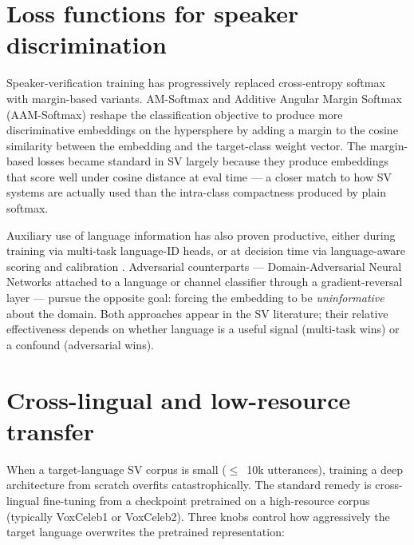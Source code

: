 \section{Loss functions for speaker discrimination}
\label{sec:related-loss}

Speaker-verification training has progressively replaced cross-entropy
softmax with margin-based variants. AM-Softmax and Additive Angular
Margin Softmax (AAM-Softmax) \cite{deng2019arcface} reshape the
classification objective to produce more discriminative embeddings
on the hypersphere by adding a margin to the cosine similarity
between the embedding and the target-class weight vector. The
margin-based losses became standard in SV largely because they
produce embeddings that score well under cosine distance at eval
time — a closer match to how SV systems are actually used than the
intra-class compactness produced by plain softmax.


Auxiliary use of language information has also proven productive,
either during training via multi-task language-ID heads, or at
decision time via language-aware scoring and calibration
\cite{thienpondt2022calibration}.
Adversarial counterparts — Domain-Adversarial Neural Networks
\cite{ganin2015dann} attached to a language or channel classifier
through a gradient-reversal layer — pursue the opposite goal: forcing
the embedding to be \emph{uninformative} about the domain. Both
approaches appear in the SV literature; their relative effectiveness
depends on whether language is a useful signal (multi-task wins)
or a confound (adversarial wins).

\section{Cross-lingual and low-resource transfer}
\label{sec:related-crosslingual}

When a target-language SV corpus is small ($\leq$~10k utterances),
training a deep architecture from scratch overfits catastrophically.
The standard remedy is cross-lingual fine-tuning from a checkpoint
pretrained on a high-resource corpus (typically VoxCeleb1 or
VoxCeleb2). Three knobs control how aggressively the target
language overwrites the pretrained representation:

